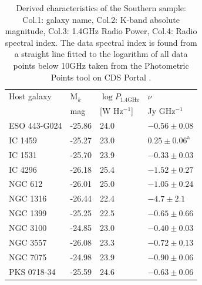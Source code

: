 	\begin{table}
		\centering
		\caption{Derived characteristics of the Southern sample: Col.1: galaxy name, Col.2: K-band absolute magnitude, Col.3: 1.4GHz Radio Power, Col.4: Radio spectral index. The data spectral index is found from a straight line fitted to the logarithm of all data points below 10GHz taken from the Photometric Points tool on CDS Portal \citep{Wenger2000}.}
		\label{tab:sampleDerived}
		\begin{tabular}{l l l l}
			\hline
			\hline
			Host galaxy	& M$_k$ & $\log P_\text{1.4GHz}$ & $\nu $ 			\\
						& mag 	& [W Hz$^{-1}$]			& Jy GHz$^{-1}$		\\
			\hline 
			ESO 443-G024 & -25.86 & 24.0 				& $-0.56 \pm 0.08$	\\
			IC 1459 	& -25.27 & 23.0 				& $0.25 \pm 0.06^\text{a}$ 	\\
			IC 1531 	& -25.70 & 23.9 				& $-0.33 \pm 0.03$ 	\\
			IC 4296		& -26.18 & 25.4 				& $-1.52 \pm 0.27$ 	\\
			NGC 612 	& -26.01 & 25.0 				& $-1.05 \pm 0.24$ 	\\
			NGC 1316 	& -26.44 & 22.4 				& $-4.7 \pm 2.1$ 	\\
			NGC 1399 	& -25.25 & 22.5 				& $-0.65 \pm 0.66$ 	\\
			NGC 3100 	& -24.85 & 23.0 				& $-0.40 \pm 0.03$ 	\\
			NGC 3557 	& -26.08 & 23.3 				& $-0.72 \pm 0.13$ 	\\
			NGC 7075 	& -24.98 & 23.9 				& $-0.90 \pm 0.06$ 	\\
			PKS 0718-34 & -25.59 & 24.6 				& $-0.63 \pm 0.06$ 	\\
			\hline
			\hline

		\end{tabular}
	\end{table}
	














